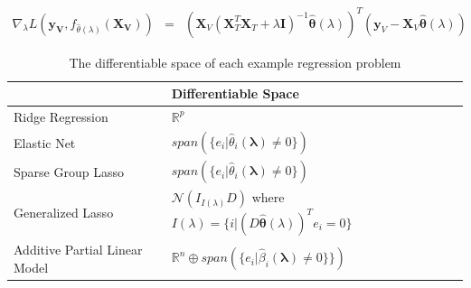 \documentclass[10pt,letterpaper]{article}
\begin{document}
\begin{equation}
\begin{array} {lcl}
\nabla_{\lambda} L(\boldsymbol{y_V}, f_{\hat \theta(\lambda)}(\boldsymbol{X_V}))
&=& (\boldsymbol{X}_V(\boldsymbol{X}_T^T \boldsymbol{X}_T + \lambda \boldsymbol{I})^{-1}
\hat{\boldsymbol{\theta}}(\lambda))^T(\boldsymbol{y}_V - \boldsymbol{X}_V \hat{\boldsymbol{\theta}}(\lambda))
\end{array}
\end{equation}

\begin{table} 
\begin{center}

\begin{tabular}{| l | l | l | }
\hline
 &  Differentiable Space \\
\hline
Ridge Regression & $\mathbb{R}^p$\\
\hline
Elastic Net & $span(\{e_i | \hat{\theta}_i\left(\boldsymbol{\lambda}\right) \ne 0 \})$\\
\hline
Sparse Group Lasso & $span(\{e_i | \hat{\theta}_i\left(\boldsymbol{\lambda}\right) \ne 0 \})$ \\
\hline
Generalized Lasso & $\mathcal{N}(I_{I(\lambda)} D)$ where $I(\lambda) = \{ i | (D \hat{\boldsymbol{\theta}}(\lambda))^T e_i = 0 \}$ \\
\hline
Additive Partial Linear Model & $\mathbb{R}^{n} \oplus span(\{e_i | \hat{\beta}_i\left(\boldsymbol{\lambda}\right) \ne 0 \} \})$\\
\hline
\end{tabular}
\end{center}
\caption {The differentiable space of each example regression problem}
\label{table:differentiableSpace}
\end{table}
\end{document}
